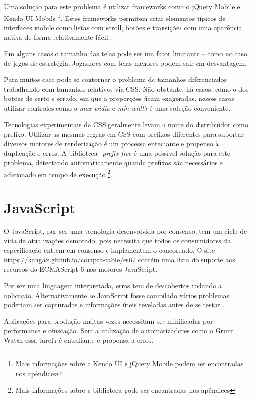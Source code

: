 Uma solução para este problema é utilizar frameworks como o jQuery
Mobile e Kendo UI Mobile \footnote{Mais informações sobre o Kendo UI
e jQuery Mobile podem ser encontradas nos apêndices}. Estes frameworks
permitem criar elementos típicos de interfaces mobile como listas
com scroll, botões e transições com uma aparência nativa de forma
relativamente fácil \autocite{publishHtml5}.

Em alguns casos o tamanho das telas pode ser um fator limitante – como
no caso de jogos de estratégia. Jogadores com telas menores podem sair
em desvantagem.

Para muitos caso pode-se contornar o problema de tamanhos diferenciados
trabalhando com tamanhos relativos via CSS. Não obstante, há casos,
como o dos botões de certo e errado, em que a proporções ficam
exageradas, nesses casos utilizar controles como o \textit{max-width} e
\textit{min-width} é uma solução conveniente.

Tecnologias experimentais do CSS geralmente levam o nome do distribuidor
como prefixo. Utilizar as mesmas regras em CSS com prefixos
diferentes para suportar diversos motores de renderização é um
processo entediante e propenso à duplicação e erros. A biblioteca
\textit{-prefix-free} é uma possível solução para este problema,
detectando automaticamente quando prefixos são necessários e
adicionado em tempo de execução \footnote{Mais informações sobre a
biblioteca pode ser encontradas nos apêndices}.

\section{JavaScript}

O JavaScript, por ser uma tecnologia desenvolvida por consenso, tem
um ciclo de vida de atualizações demorado; pois necessita que todos
os consumidores da especificação entrem em consenso e implementem o
concordado. O site \url{https://kangax.github.io/compat-table/es6/}
contém uma lista do suporte aos recursos do ECMAScript 6 nos motores
JavaScript.

Por ser uma linguagem interpretada, erros tem de descobertos rodando
a aplicação. Alternativamente se JavaScript fosse compilado vários
problemas poderiam ser capturados e informações úteis reveladas antes
de se testar \autocite[pp. 12]{viabilityBusinessApplications}.

Aplicações para produção muitas vezes necessitam ser minificadas por
performance e ofuscação. Sem a utilização de automatizadores como o
Grunt Watch essa tarefa é entediante e propensa a erros.

